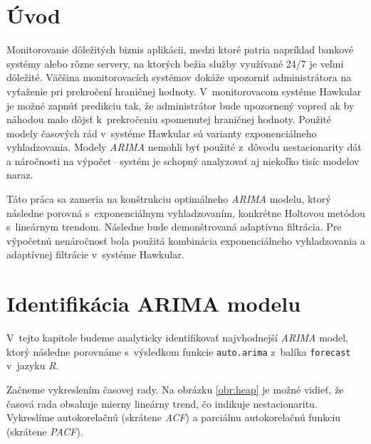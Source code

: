 \documentclass[12pt,a4paper,oneside,final]{article}
\theoremstyle{definition}
\theoremstyle{remark}
\numberwithin{equation}{section}
\begin{document}
\VytvorTitulniStranu

\section{Úvod}
Monitorovanie dôležitých biznis aplikácii, medzi ktoré patria napríklad bankové systémy alebo rôzne
servery, na ktorých bežia služby využívané 24/7 je veľmi dôležité. Väčšina
monitorovacích systémov dokáže upozorniť administrátora na vyťaženie pri prekročení
hraničnej hodnoty. V~monitorovacom systéme Hawkular je možné zapnúť predikciu tak, že
administrátor bude upozornený vopred ak by náhodou malo dôjsť k~prekročeniu spomenutej
hraničnej hodnoty. Použité modely časových rád v~systéme Hawkular sú varianty
exponenciálneho vyhladzovania. Modely \emph{ARIMA} nemohli byť použité z~dôvodu nestacionarity dát 
a náročnosti na výpočet\,--\,systém je schopný analyzovať aj niekoľko tisíc modelov naraz. 

Táto práca sa zameria na konštrukciu optimálneho \emph{ARIMA} modelu, ktorý následne porovná
s~exponenciálnym vyhladzovaním, konkrétne Holtovou metódou s~lineárnym trendom. Následne
bude demonštrovaná adaptívna filtrácia. Pre výpočetnú nenáročnosť  bola použitá 
kombinácia exponenciálneho vyhladzovania a
adaptívnej filtrácie v~systéme Hawkular.


\section{Identifikácia ARIMA modelu}
V~tejto kapitole budeme analyticky identifikovať najvhodnejší \emph{ARIMA} model, ktorý následne 
porovnáme s~výsledkom funkcie \texttt{auto.arima} z~balíka \texttt{forecast} v~jazyku
\emph{R}.

Začneme vykreslením časovej rady. Na obrázku \ref{obr:heap} je možné vidieť, že časová rada 
obsahuje mierny lineárny trend, čo indikuje nestacionaritu. Vykreslíme autokorelačnú 
(skrátene \emph{ACF}) a parciálnu autokorelačnú funkciu (skrátene \emph{PACF}).
\end{document}

